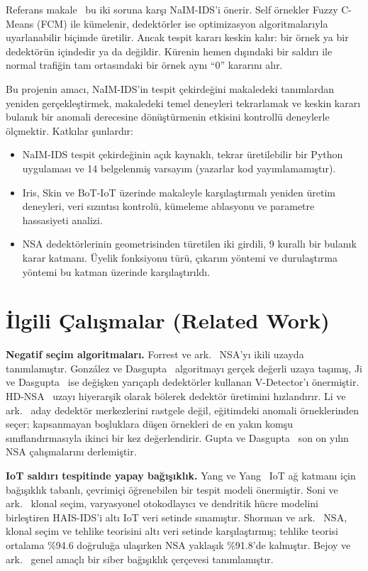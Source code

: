 \documentclass[11pt,a4paper]{article}
\begin{document}
Referans makale~\cite{ma2024} bu iki soruna karşı NaIM-IDS'i önerir. Self örnekler Fuzzy C-Means (FCM) ile kümelenir, dedektörler ise optimizasyon algoritmalarıyla uyarlanabilir biçimde üretilir. Ancak tespit kararı keskin kalır: bir örnek ya bir dedektörün içindedir ya da değildir. Kürenin hemen dışındaki bir saldırı ile normal trafiğin tam ortasındaki bir örnek aynı ``0'' kararını alır.

Bu projenin amacı, NaIM-IDS'in tespit çekirdeğini makaledeki tanımlardan yeniden gerçekleştirmek, makaledeki temel deneyleri tekrarlamak ve keskin kararı bulanık bir anomali derecesine dönüştürmenin etkisini kontrollü deneylerle ölçmektir. Katkılar şunlardır:
\begin{itemize}
  \item NaIM-IDS tespit çekirdeğinin açık kaynaklı, tekrar üretilebilir bir Python uygulaması ve 14 belgelenmiş varsayım (yazarlar kod yayımlamamıştır).
  \item Iris, Skin ve BoT-IoT üzerinde makaleyle karşılaştırmalı yeniden üretim deneyleri, veri sızıntısı kontrolü, kümeleme ablasyonu ve parametre hassasiyeti analizi.
  \item NSA dedektörlerinin geometrisinden türetilen iki girdili, 9 kurallı bir bulanık karar katmanı. Üyelik fonksiyonu türü, çıkarım yöntemi ve durulaştırma yöntemi bu katman üzerinde karşılaştırıldı.
\end{itemize}

\section{İlgili Çalışmalar (Related Work)}

\textbf{Negatif seçim algoritmaları.} Forrest ve ark.~\cite{forrest1994} NSA'yı ikili uzayda tanımlamıştır. González ve Dasgupta~\cite{gonzalez2003} algoritmayı gerçek değerli uzaya taşımış, Ji ve Dasgupta~\cite{ji2004} ise değişken yarıçaplı dedektörler kullanan V-Detector'ı önermiştir. HD-NSA~\cite{he2021} uzayı hiyerarşik olarak bölerek dedektör üretimini hızlandırır. Li ve ark.~\cite{li2025} aday dedektör merkezlerini rastgele değil, eğitimdeki anomali örneklerinden seçer; kapsanmayan boşluklara düşen örnekleri de en yakın komşu sınıflandırmasıyla ikinci bir kez değerlendirir. Gupta ve Dasgupta~\cite{gupta2021} son on yılın NSA çalışmalarını derlemiştir.

\textbf{IoT saldırı tespitinde yapay bağışıklık.} Yang ve Yang~\cite{yang2021} IoT ağ katmanı için bağışıklık tabanlı, çevrimiçi öğrenebilen bir tespit modeli önermiştir. Soni ve ark.~\cite{soni2025} klonal seçim, varyasyonel otokodlayıcı ve dendritik hücre modelini birleştiren HAIS-IDS'i altı IoT veri setinde sınamıştır. Shorman ve ark.~\cite{shorman2025} NSA, klonal seçim ve tehlike teorisini altı veri setinde karşılaştırmış; tehlike teorisi ortalama \%94.6 doğruluğa ulaşırken NSA yaklaşık \%91.8'de kalmıştır. Bejoy ve ark.~\cite{bejoy2022} genel amaçlı bir siber bağışıklık çerçevesi tanımlamıştır.
\end{document}
